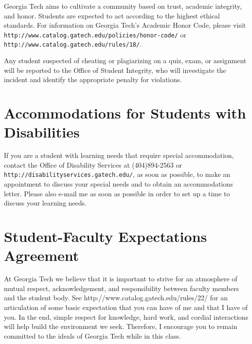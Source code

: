 \documentclass[12pt]{article}
\begin{document}
Georgia Tech aims to cultivate a community based on trust, academic integrity, and honor. Students are expected to act according to the highest ethical standards.  For information on Georgia Tech's Academic Honor Code, please visit \verb+http://www.catalog.gatech.edu/policies/honor-code/+ or \verb+http://www.catalog.gatech.edu/rules/18/+. 

Any student suspected of cheating or plagiarizing on a quiz, exam, or assignment will be reported to the Office of Student Integrity, who will investigate the incident and identify the appropriate penalty for violations. 

\section{Accommodations for Students with Disabilities} 

If you are a student with learning needs that require special accommodation, contact the Office of Disability Services at (404)894-2563 or \verb+http://disabilityservices.gatech.edu/+, as soon as possible, to make an appointment to discuss your special needs and to obtain an accommodations letter.  Please also e-mail me as soon as possible in order to set up a time to discuss your learning needs. 

\section{Student-Faculty Expectations Agreement} 

At Georgia Tech we believe that it is important to strive for an atmosphere of mutual respect, acknowledgement, and responsibility between faculty members and the student body. See http://www.catalog.gatech.edu/rules/22/ for an articulation of some basic expectation that you can have of me and that I have of you. In the end, simple respect for knowledge, hard work, and cordial interactions will help build the environment we seek. Therefore, I encourage you to remain committed to the ideals of Georgia Tech while in this class. 


\end{document}
